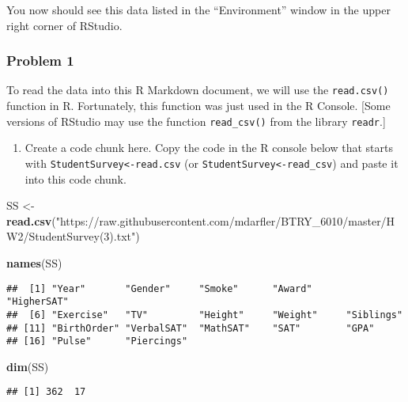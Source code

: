 \documentclass[]{article}
\newenvironment{Shaded}{\begin{snugshade}}{\end{snugshade}}
\newcommand{\KeywordTok}[1]{\textcolor[rgb]{0.13,0.29,0.53}{\textbf{#1}}}
\newcommand{\NormalTok}[1]{#1}
\newcommand{\StringTok}[1]{\textcolor[rgb]{0.31,0.60,0.02}{#1}}
\providecommand{\tightlist}{%
  \setlength{\itemsep}{0pt}\setlength{\parskip}{0pt}}
\begin{document}
You now should see this data listed in the ``Environment'' window in the
upper right corner of RStudio.

\hypertarget{problem-1}{%
\subsubsection{Problem 1}\label{problem-1}}

To read the data into this R Markdown document, we will use the
\texttt{read.csv()} function in R. Fortunately, this function was just
used in the R Console. {[}Some versions of RStudio may use the function
\texttt{read\_csv()} from the library \texttt{readr}.{]}

\begin{enumerate}
\def\labelenumi{\alph{enumi})}
\tightlist
\item
  Create a code chunk here. Copy the code in the R console below that
  starts with \texttt{StudentSurvey\textless{}-read.csv} (or
  \texttt{StudentSurvey\textless{}-read\_csv}) and paste it into this
  code chunk.
\end{enumerate}

\begin{Shaded}
\begin{Highlighting}[]
\NormalTok{SS <-}\StringTok{ }\KeywordTok{read.csv}\NormalTok{(}\StringTok{"https://raw.githubusercontent.com/mdarfler/BTRY_6010/master/HW2/StudentSurvey(3).txt"}\NormalTok{)}

\KeywordTok{names}\NormalTok{(SS)}
\end{Highlighting}
\end{Shaded}

\begin{verbatim}
##  [1] "Year"       "Gender"     "Smoke"      "Award"      "HigherSAT" 
##  [6] "Exercise"   "TV"         "Height"     "Weight"     "Siblings"  
## [11] "BirthOrder" "VerbalSAT"  "MathSAT"    "SAT"        "GPA"       
## [16] "Pulse"      "Piercings"
\end{verbatim}

\begin{Shaded}
\begin{Highlighting}[]
\KeywordTok{dim}\NormalTok{(SS)}
\end{Highlighting}
\end{Shaded}

\begin{verbatim}
## [1] 362  17
\end{verbatim}
\end{document}
